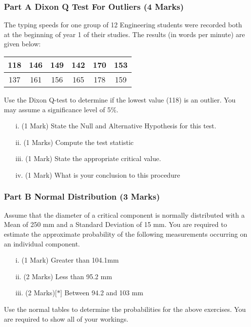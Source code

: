 \documentclass[a4paper,12pt]{article}
\begin{document}
\subsubsection*{Part A Dixon Q Test For Outliers (4 Marks)}

The typing speeds for one group of 12 Engineering students were recorded both at the beginning of year 1 of their studies. The results (in words per minute) are given below:

\begin{center}
	\begin{tabular}{|c|c|c|c|c|c|}
		\hline
		118 & 146 & 149 & 142 & 170& 153\\ \hline
		137 & 161 & 156& 165&  178& 159
		\\ \hline
	\end{tabular}
\end{center}
Use the Dixon Q-test to determine if the lowest value (118) is an outlier. You may assume a significance level of 5\%.
\begin{itemize}
	\item[i.](1 Mark)	State the Null and Alternative Hypothesis for this test.
	\item[ii.](1 Marks) Compute the test statistic
	\item[iii.](1 Mark) State the appropriate critical value.
	\item[iv.](1 Mark) What is your conclusion to this procedure
\end{itemize}

%


\subsubsection*{Part B Normal Distribution (3 Marks)} 
Assume that the diameter of a critical component is normally distributed with a Mean of 250 mm and a Standard Deviation of 15 mm. You are required  to estimate the approximate probability of the following measurements occurring on an individual component.
\begin{itemize}
	\item[i.](1 Mark)	Greater than 104.1mm
	\item[ii.](2 Marks) Less than 95.2 mm
	\item [iii.](2 Marks)[$\ast$] Between 94.2 and 103 mm
\end{itemize}
\bigskip
\noindent Use the normal tables to determine the probabilities for the above exercises. You are required to show all of your workings.
\end{document}
